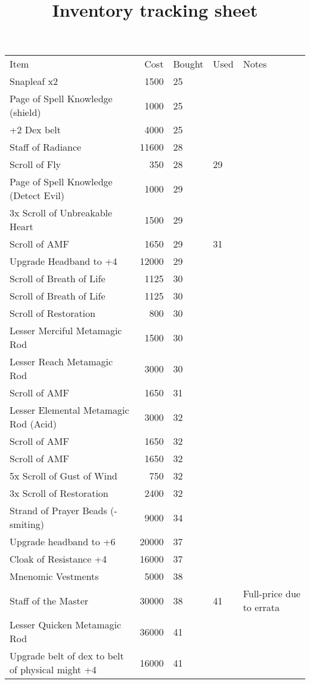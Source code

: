 \documentclass[a4paper,10pt]{memoir}
\title{Inventory tracking sheet}
\begin{document}
\begin{tabular}{l r l l l}
Item                             &  Cost 	& Bought & Used & Notes \\
Snapleaf x2                      &  1500	& 25     &      &       \\
Page of Spell Knowledge (shield) &  1000	& 25     &      &       \\
+2 Dex belt			 &  4000	& 25     &      & \\
Staff of Radiance		 & 11600	& 28	 &	& \\
Scroll of Fly			 &   350	& 28	 & 29   & \\
Page of Spell Knowledge (Detect Evil) & 1000	& 29	 &	& \\
3x Scroll of Unbreakable Heart	 &   1500	& 29	 &	& \\
Scroll of AMF			 &   1650	& 29	 & 31	& \\
Upgrade Headband to +4		 &  12000	& 29	 &	& \\
Scroll of Breath of Life	 &   1125	& 30	 &	& \\
Scroll of Breath of Life	 &   1125	& 30	 &	& \\
Scroll of Restoration		 &    800	& 30	 &	& \\
Lesser Merciful Metamagic Rod    &   1500	& 30	 &	& \\
Lesser Reach Metamagic Rod	 &   3000	& 30	 & 	& \\
Scroll of AMF			 &   1650	& 31	 &	& \\
Lesser Elemental Metamagic Rod (Acid) & 3000	& 32	 &	& \\
Scroll of AMF			 &   1650	& 32	 &	& \\
Scroll of AMF			 &   1650	& 32	 &	& \\
5x Scroll of Gust of Wind	 &    750	& 32	 &	& \\
3x Scroll of Restoration	 &   2400	& 32	 &	& \\
Strand of Prayer Beads (-smiting)&   9000	& 34	 &	& \\
Upgrade headband to +6		 &  20000	& 37	 &	& \\
Cloak of Resistance +4		 &  16000	& 37	 &	& \\
Mnenomic Vestments		 &   5000	& 38	 &	& \\
Staff of the Master		 &  30000	& 38	 & 41   & Full-price due to errata \\
Lesser Quicken Metamagic Rod     &  36000	& 41	 &      & \\
Upgrade belt of dex to belt of physical might +4
                                 &  16000       & 41     &      & \\


\end{tabular}
\end{document}

